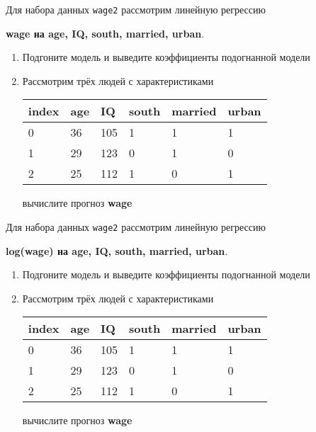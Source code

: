 \begin{exercise}
Для набора данных \texttt{wage2} рассмотрим линейную регрессию 
\begin{center}
	\textbf{wage на age, IQ, south, married, urban}.
\end{center}
\begin{enumerate}
	\item Подгоните модель и выведите коэффициенты подогнанной модели
	\item Рассмотрим трёх людей с характеристиками
	\begin{center}
		\begin{tabular}{|l||l|l|l|l|l|}\hline
			index & age & IQ & south & married & urban \\ \hline\hline
			0 & 36 & 105 & 1 & 1 & 1 \\
			1 & 29 & 123 & 0 & 1 & 0 \\
			2 & 25 & 112 & 1 & 0 & 1 \\ \hline
		\end{tabular}
	\end{center}
	вычислите прогноз \textbf{wage} 
\end{enumerate}
\end{exercise}

\begin{exercise}
Для набора данных \texttt{wage2} рассмотрим линейную регрессию 
\begin{center}
	\textbf{log(wage) на age, IQ, south, married, urban}.
\end{center}
\begin{enumerate}
	\item Подгоните модель и выведите коэффициенты подогнанной модели
	\item Рассмотрим трёх людей с характеристиками
	\begin{center}
		\begin{tabular}{|l||l|l|l|l|l|}\hline
			index & age & IQ & south & married & urban \\ \hline\hline
			0 & 36 & 105 & 1 & 1 & 1 \\
			1 & 29 & 123 & 0 & 1 & 0 \\
			2 & 25 & 112 & 1 & 0 & 1 \\ \hline
		\end{tabular}
	\end{center}
	вычислите прогноз \textbf{wage} 
\end{enumerate}
\end{exercise}

